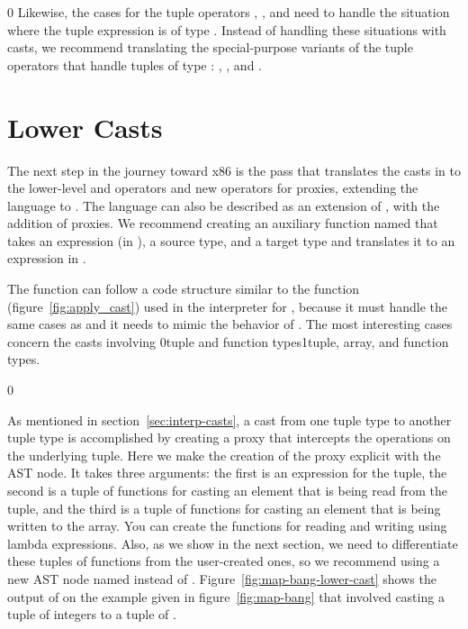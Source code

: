 \documentclass[7x10]{TimesAPriori_MIT}%
\def\racketEd{0}
\def\pythonEd{1}
\def\edition{1}
\newcommand{\racket}[1]{{\if\edition\racketEd{#1}\fi}}
\newcommand{\pythonColor}[0]{}
\newcommand{\python}[1]{{\if\edition\pythonEd\pythonColor #1\fi}}
\numberwithin{theorem}{chapter}
\numberwithin{definition}{chapter}
\numberwithin{equation}{chapter}
\begin{document}
{\if\edition\racketEd
%  
Likewise, the cases for the tuple operators ,
, and  need to handle the situation
where the tuple expression is of type \CANYTY{}. Instead of
handling these situations with casts, we recommend translating
the special-purpose variants of the tuple operators that handle
tuples of type \CANYTY{}: ,
, and .
%
\fi}


\section{Lower Casts}
\label{sec:lower_casts}

The next step in the journey toward x86 is the 
pass that translates the casts in \LangCast{} to the lower-level
 and  operators and new operators for
proxies, extending the \LangLam{} language to \LangProxy{}.
The \LangProxy{} language can also be described as an extension of
\LangAny{}, with the addition of proxies. We recommend creating an
auxiliary function named  that takes an expression
(in \LangCast{}), a source type, and a target type and translates it
to an expression in \LangProxy{}.

The  function can follow a code structure similar to
the  function (figure~\ref{fig:apply_cast}) used in
the interpreter for \LangCast{}, because it must handle the same cases
as  and it needs to mimic the behavior of
. The most interesting cases concern
the casts involving \racket{tuple and function types}\python{tuple, array, and function types}.


{\if\edition\racketEd

As mentioned in section~\ref{sec:interp-casts}, a cast from one tuple
type to another tuple type is accomplished by creating a proxy that
intercepts the operations on the underlying tuple. Here we make the
creation of the proxy explicit with the  AST
node. It takes three arguments: the first is an expression for the
tuple, the second is a tuple of functions for casting an element that is
being read from the tuple, and the third is a tuple of functions for
casting an element that is being written to the array.  You can create
the functions for reading and writing using lambda expressions.  Also,
as we show in the next section, we need to differentiate these tuples
of functions from the user-created ones, so we recommend using a new
AST node named  instead of .
%
Figure~\ref{fig:map-bang-lower-cast} shows the output of
 on the example given in figure~\ref{fig:map-bang}
that involved casting a tuple of integers to a tuple of \CANYTY{}.

\fi}
\end{document}
